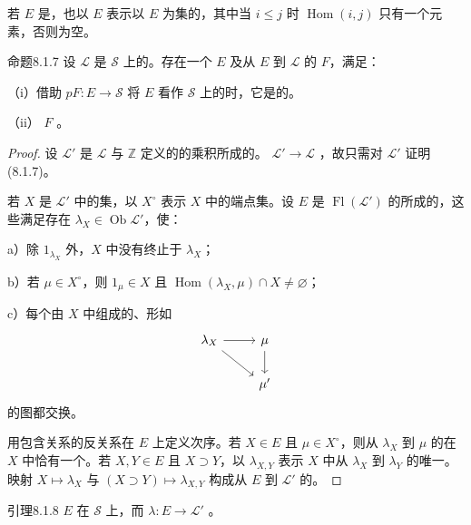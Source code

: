 若 $E$ 是，也以 $E$ 表示以 $E$ 为集的，其中当 $i\leq j$ 时 $\operatorname{Hom}(i,j)$ 只有一个元素，否则为空。
\begin{SGAresult}{命题}{8.1.7}
设 $\mathscr L$ 是 $\mathscr S$ 上的。存在一个 $E$ 及从 $E$ 到 $\mathscr L$ 的 $F$，满足：

（i）借助 $pF:E\to\mathscr S$ 将 $E$ 看作 $\mathscr S$ 上的时，它是的。

（ii） $F$ 。
\end{SGAresult}
\begin{proof}
设 $\mathscr L'$ 是 $\mathscr L$ 与 $\mathbb Z$ 定义的的乘积所成的。 $\mathscr L'\to\mathscr L$ ，故只需对 $\mathscr L'$ 证明 (8.1.7)。

若 $X$ 是 $\mathscr L'$ 中的集，以 $X^\circ$ 表示 $X$ 中的端点集。设 $E$ 是 $\operatorname{Fl}(\mathscr L')$ 的所成的，这些满足存在 $\lambda_X\in\operatorname{Ob}\mathscr L'$，使：

a）除 $1_{\lambda_X}$ 外，$X$ 中没有终止于 $\lambda_X$；

b）若 $\mu\in X^\circ$，则 $1_\mu\in X$ 且 $\operatorname{Hom}(\lambda_X,\mu)\cap X\ne\varnothing$；

c）每个由 $X$ 中组成的、形如
\[\begin{tikzcd}\lambda_X\arrow[r]\arrow[dr]&\mu\arrow[d]\\&\mu'\end{tikzcd}\]
的图都交换。

用包含关系的反关系在 $E$ 上定义次序。若 $X\in E$ 且 $\mu\in X^\circ$，则从 $\lambda_X$ 到 $\mu$ 的在 $X$ 中恰有一个。若 $X,Y\in E$
且 $X\supset Y$，以 $\lambda_{X,Y}$ 表示 $X$ 中从 $\lambda_X$ 到 $\lambda_Y$ 的唯一。映射 $X\mapsto\lambda_X$ 与 $(X\supset Y)\mapsto\lambda_{X,Y}$ 构成从 $E$ 到 $\mathscr L'$ 的。
\end{proof}
\begin{SGAresult}{引理}{8.1.8}
 $E$ 在 $\mathscr S$ 上，而 $\lambda:E\to\mathscr L'$ 。
\end{SGAresult}
